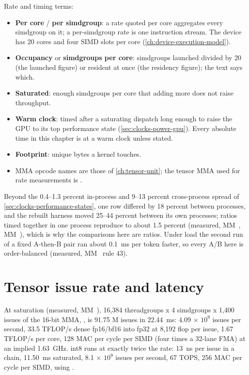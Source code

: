 Rate and timing terms:

\begin{itemize}
\item \textbf{Per core} / \textbf{per simdgroup}: a rate quoted per core aggregates every simdgroup on it; a per-simdgroup rate is
  one instruction stream. The device has 20 cores and four SIMD slots per core (\cref{ch:device-execution-model}).
\item \textbf{Occupancy} or \textbf{simdgroups per core}: simdgroups launched divided by 20 (the launched figure) or resident at once
  (the residency figure); the text says which.
\item \textbf{Saturated}: enough simdgroups per core that adding more does not raise throughput.
\item \textbf{Warm clock}: timed after a saturating dispatch long enough to raise the GPU to its top performance state
  (\cref{sec:clocks-power-gpu}). Every absolute time in this chapter is at a warm clock unless stated.
\item \textbf{Footprint}: unique bytes a kernel touches.
\item MMA opcode names are those of \cref{ch:tensor-unit}; the tensor MMA used for rate measurements is .
\end{itemize}

Beyond the 0.4–1.3 percent in-process and 9–13 percent cross-process spread of \cref{sec:clocks-performance-states},
one row differed by 18 percent between processes, and the rebuilt harness moved 25–44
percent between its own processes; ratios timed together in one process reproduce to about 1.5 percent (measured,
MM~, MM~), which is why the comparisons here are ratios. Under load the second run of a fixed A-then-B pair ran
about 0.1~ms per token faster, so every A/B here is order-balanced (measured, MM~ rule 43).

\section{Tensor issue rate and latency}\label{sec:tensor-issue-rate}

At saturation (measured, MM~), 16,384 threadgroups x 4 simdgroups x 1,400 issues of the 16-bit MMA, , is 91.75 M issues in
22.44~ms: 4.09 × $10^{9}$ issues per second, 33.5 TFLOP/s dense fp16/bf16 into fp32 at 8,192 flop per issue, 1.67
TFLOP/s per core, 128 MAC per cycle per SIMD (four times a 32-lane FMA) at an implied 1.63~GHz. int8 runs at exactly
twice the rate: 13~ns per issue in a chain, 11.50~ms saturated, 8.1 × $10^{9}$ issues per second, 67 TOPS, 256 MAC per cycle
per SIMD, using .

